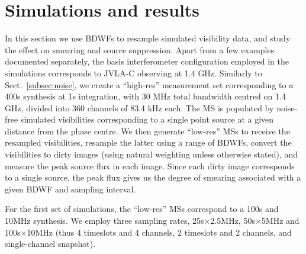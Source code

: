 \documentclass[useAMS,usenatbib]{mn2e}
\newcommand{\OMS}[1]{\textcolor{red}{{\bf OMS: #1}}}
\begin{document}
\section{Simulations and results}

\newcommand{\BIN}[2]{#1s$\times$#2MHz}

In this section we use BDWFs to resample simulated visibility data, and study the effect on smearing and source 
suppression. Apart from a few examples documented separately, the basis interferometer configuration employed in 
the simulations corresponds to JVLA-C observing at 1.4 GHz. Similarly to Sect.~\ref{subsec:noise}, we create a 
``high-res'' measurement set corresponding to a 400s synthesis at 1s integration, with 30 MHz total bandwidth
centred on 1.4 GHz, divided into 360 channels of 83.4 kHz each.
The MS is populated by noise-free simulated visibilities corresponding to a single point source at 
a given distance from the phase centre. We then generate ``low-res'' MSs to receive the resampled visibilities,
resample the latter using a range of BDWFs, convert the visibilities to dirty images (using natural weighting
unless otherwise stated), and measure the peak source flux in each image. Since each dirty image corresponds to 
a single source, the peak flux gives us the degree of smearing associated with a given BDWF and sampling interval.

For the first set of simulations, the ``low-res'' MSs correspond to a 100s and 10MHz synthesis. We employ three 
sampling rates, \BIN{25}{2.5}, \BIN{50}{5} and \BIN{100}{10} (thus 4 timeslots and 4 channels, 2 timeslots
and 2 channels, and single-channel snapshot).
\end{document}
